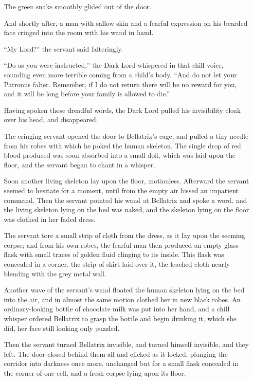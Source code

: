 The green snake smoothly glided out of the door.

And shortly after, a man with sallow skin and a fearful expression on his bearded face cringed into the room with his wand in hand.

“My Lord?” the servant said falteringly.

“Do as you were instructed,” the Dark Lord whispered in that chill voice, sounding even more terrible coming from a child’s body. “And do not let your Patronus falter. Remember, if I do not return there will be no reward for you, and it will be long before your family is allowed to die.”

Having spoken those dreadful words, the Dark Lord pulled his invisibility cloak over his head, and disappeared.

The cringing servant opened the door to Bellatrix’s cage, and pulled a tiny needle from his robes with which he poked the human skeleton. The single drop of red blood produced was soon absorbed into a small doll, which was laid upon the floor, and the servant began to chant in a whisper.

Soon another living skeleton lay upon the floor, motionless. Afterward the servant seemed to hesitate for a moment, until from the empty air hissed an impatient command. Then the servant pointed his wand at Bellatrix and spoke a word, and the living skeleton lying on the bed was naked, and the skeleton lying on the floor was clothed in her faded dress.

The servant tore a small strip of cloth from the dress, as it lay upon the seeming corpse; and from his own robes, the fearful man then produced an empty glass flask with small traces of golden fluid clinging to its inside. This flask was concealed in a corner, the strip of skirt laid over it, the leached cloth nearly blending with the grey metal wall.

Another wave of the servant’s wand floated the human skeleton lying on the bed into the air, and in almost the same motion clothed her in new black robes. An ordinary-looking bottle of chocolate milk was put into her hand, and a chill whisper ordered Bellatrix to grasp the bottle and begin drinking it, which she did, her face still looking only puzzled.

Then the servant turned Bellatrix invisible, and turned himself invisible, and they left. The door closed behind them all and clicked as it locked, plunging the corridor into darkness once more, unchanged but for a small flask concealed in the corner of one cell, and a fresh corpse lying upon its floor.

